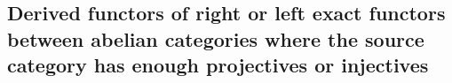 \subsection{Derived functors of right or left exact functors between abelian categories where the source category has enough projectives or injectives}






        


